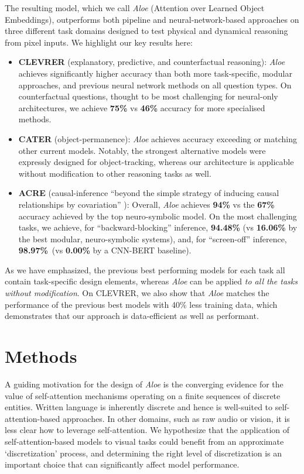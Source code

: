 \documentclass{article}
\newcommand{\Model}{\emph{Aloe}}
\begin{document}
The resulting model, which we call \Model{} (Attention over Learned Object Embeddings), outperforms both pipeline and neural-network-based approaches on three different task domains designed to test  physical and dynamical reasoning from pixel inputs. We highlight our key results here:
\begin{itemize}[leftmargin=0.8cm]
    \item \textbf{CLEVRER} (explanatory, predictive, and counterfactual reasoning): \Model{} achieves significantly higher accuracy than both more task-specific, modular approaches, and previous neural network methods on all question types. On counterfactual questions, thought to be most challenging for neural-only architectures, we achieve \textbf{75\%} vs \textbf{46\%} accuracy for more specialised methods.

    \item \textbf{CATER} (object-permanence): \Model{} achieves accuracy exceeding or matching other current models.
    Notably, the strongest alternative models were expressly designed for object-tracking,
    whereas our architecture is applicable without modification to other reasoning tasks as well.

    \item \textbf{ACRE} (causal-inference ``beyond the simple strategy of inducing causal
relationships by covariation'' \citep{acre}):  Overall, \Model{} achieves \textbf{94\%} vs the \textbf{67\%} accuracy achieved by the top neuro-symbolic model.
On the most challenging tasks,
we achieve, for ``backward-blocking'' inference, \textbf{94.48\%} (vs \textbf{16.06\%} by the best modular, neuro-symbolic systems),
and, for ``screen-off'' inference, \textbf{98.97\%}~(vs \textbf{0.00\%} by a CNN-BERT baseline). 
\end{itemize}

As we have emphasized, the previous best performing models for each task all contain task-specific design elements, whereas \Model{} can be applied \emph{to all the tasks without modification}.
On CLEVRER, we also show that \Model{} matches the performance of the previous best models with 40\% less training data, which demonstrates that our approach is data-efficient as well as performant.


\section{Methods}
\label{section:methods}
A guiding motivation for the design of \Model{} is the converging evidence for the value of self-attention mechanisms operating on a finite sequences of discrete entities. Written language is inherently discrete and hence is well-suited to self-attention-based approaches. In other domains, such as raw audio or vision, it is less clear how to leverage self-attention. We hypothesize that the application of self-attention-based models to visual tasks could benefit from an approximate `discretization' process, and determining the right level of discretization is an important choice that can significantly affect model performance.
\end{document}
